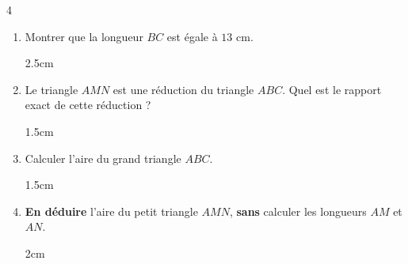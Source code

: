 \documentclass[a4paper]{book}
\begin{document}
{\begin{exerciceNote}{4}
        \begin{center}
        \end{center}
        
        \begin{enumerate}
            \item Montrer que la longueur $BC$ est égale à $13$ cm.
            \begin{ZoneReponse}{2.5cm}
            \end{ZoneReponse}
            
            \item Le triangle $AMN$ est une réduction du triangle $ABC$. Quel est le rapport exact de cette réduction ?
            \begin{ZoneReponse}{1.5cm}
            \end{ZoneReponse}
            
            \item Calculer l'aire du grand triangle $ABC$.
            \begin{ZoneReponse}{1.5cm}
            \end{ZoneReponse}
            
            \item \textbf{En déduire} l'aire du petit triangle $AMN$, \textbf{sans} calculer les longueurs $AM$ et $AN$.
            \begin{ZoneReponse}{2cm}
            \end{ZoneReponse}
        \end{enumerate}
    \end{exerciceNote}


\newpage
\setcounter{exo}{0}

\NomPrenom
{}


    \TableauCompetencesQuatre
        {} %
        {} %
        {} %
        {} %


}
\end{document}
